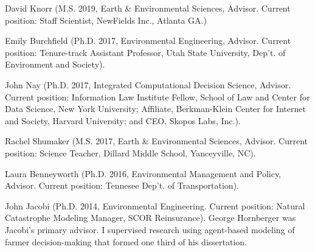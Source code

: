 \item David Knorr (M.S. 2019, Earth \& Environmental Sciences, Advisor. Current position: Staff Scientist, NewFields Inc., Atlanta GA.)
\item Emily Burchfield (Ph.D. 2017, Environmental Engineering, Advisor. Current position: Tenure-track Assistant Professor, Utah State University, Dep't. of Environment and Society).
\item John Nay (Ph.D. 2017, Integrated Computational Decision Science, Advisor. Current position: Information Law Institute Fellow, School of Law and Center for Data Science, New York University; Affiliate, Berkman-Klein Center for Internet and Society, Harvard University; and CEO, Skopos Labs, Inc.).
\item Rachel Shumaker (M.S. 2017, Earth \& Environmental Sciences, Advisor. Current position: Science Teacher, Dillard Middle School, Yanceyville, NC).
\item Laura Benneyworth (Ph.D. 2016, Environmental Management and Policy, Advisor. Current position: Tennesee Dep't. of Transportation).
\item John Jacobi (Ph.D. 2014, Environmental Engineering. Current position: Natural Catastrophe Modeling Manager, SCOR Reinsurance). George Hornberger was Jacobi's primary advisor. I supervised research using agent-based modeling of farmer decision-making that formed one third of his dissertation.

